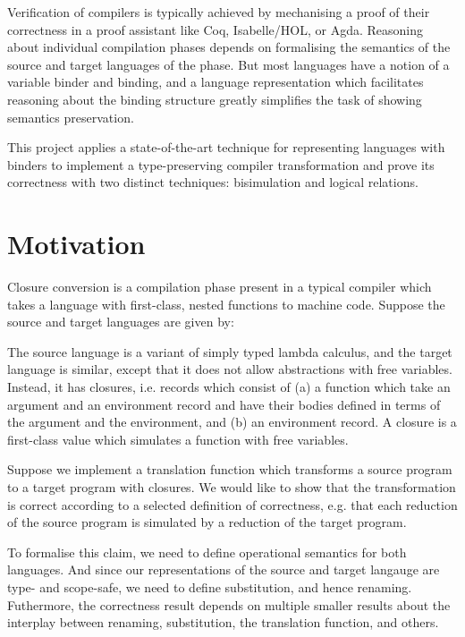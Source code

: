 \documentclass[bsc,frontabs,oneside,singlespacing,parskip,deptreport]{infthesis}
\theoremstyle{definition}
\theoremstyle{lemma}
\begin{document}
Verification of compilers is typically achieved by mechanising a proof
of their correctness in a proof assistant like Coq, Isabelle/HOL, or
Agda. Reasoning about individual compilation phases depends on
formalising the semantics of the source and target languages of the
phase. But most languages have a notion of a variable binder and
binding, and a language representation which facilitates reasoning
about the binding structure greatly simplifies the task of showing
semantics preservation.

This project applies a state-of-the-art technique for representing
languages with binders to implement a type-preserving compiler
transformation and prove its correctness with two distinct techniques: 
bisimulation and logical relations.

\section{Motivation}
\label{sec:motivation}

Closure conversion is a compilation phase present in a typical
compiler which takes a language with first-class, nested functions to
machine code. Suppose the source and target languages are given by:

\begin{minipage}{.5\textwidth}
  {\centering {}}
\end{minipage}%
\begin{minipage}{.5\textwidth}
  {\centering {}}
\end{minipage}

The source language is a variant of simply typed lambda calculus, and
the target language is similar, except that it does not allow
abstractions with free variables. Instead, it has closures,
i.e. records which consist of (a) a function which take an argument
and an environment record and have their bodies defined in terms of
the argument and the environment, and (b) an environment record. A
closure is a first-class value which simulates a function with free
variables.

Suppose we implement a translation function which transforms a source
program to a target program with closures. We would like to show that
the transformation is correct according to a selected definition of
correctness, e.g. that each reduction of the source program is
simulated by a reduction of the target program.

To formalise this claim, we need to define operational semantics for
both languages. And since our representations of the source and target
langauge are type- and scope-safe, we need to define substitution, and
hence renaming. Futhermore, the correctness result depends on multiple
smaller results about the interplay between renaming, substitution,
the translation function, and others.
\end{document}
